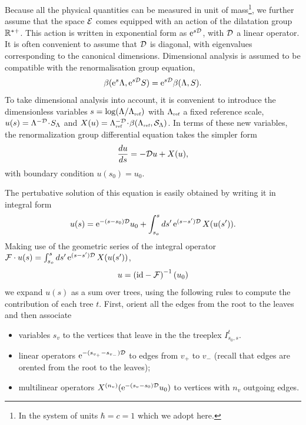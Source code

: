 \documentclass[12pt,here,feynmf]{article}
\begin{document}
Because all the physical quantities can be measured in unit of mass\footnote{In the system of units $\hbar=c=1$ which we adopt here.}, we further assume that the space ${\cal E}$ comes equipped with an action of the dilatation group ${\Bbb R}^{\ast+}$. This action is  written in exponential form as  $\mathrm{e}^{s{\cal D}}$, with ${\cal D}$ a linear operator. It is often convenient to assume that ${\cal D}$ is diagonal, with eigenvalues corresponding to the canonical dimensions. Dimensional analysis is assumed to be compatible with the renormalisation group equation,
\begin{equation}
\beta(\mathrm{e}^{s}\Lambda,\mathrm{e}^{s{\cal D}}
S)=\mathrm{e}^{s{\cal D}}\beta(\Lambda,S).
\end{equation}
To take dimensional analysis into account, it is convenient to  introduce the dimensionless variables
$s=\log(\Lambda/\Lambda_{\mbox{\tiny ref}})$ with
$\Lambda_{\mbox{\tiny ref}}$ a fixed reference scale,
$u(s)=\Lambda^{-{\cal D}}\!\cdot\!S_{\Lambda}$ and
$X(u)={\Lambda}^{-{\cal D}}_{\mbox{\tiny
ref}}\!\cdot\!\beta({\Lambda}_{\mbox{\tiny ref}},{\cal
S}_{\Lambda})$. In terms of these new variables, the renormalization group differential equation takes the simpler form
\begin{equation}
\frac{du}{ds}=-{\cal D}u+X(u),
\end{equation}
with boundary condition $u(s_{0})=u_{0}$. 

The pertubative solution of this equation is easily obtained by writing it in integral form
\begin{equation}
u(s)=\mathrm{e}^{-(s-s_{0}){\cal D}}u_{0}+\int_{s_{o}}^{s}ds'\, \mathrm{e}^{(s-s'){\cal D}}\,X(u(s')).\label{fixedrg}
\end{equation}
Making use of the geometric series of the integral operator ${\cal F}\cdot u(s)=\int_{s_{o}}^{s}ds'\, \mathrm{e}^{(s-s'){\cal D}}\,X(u(s'))$, 
\begin{equation}
u=\left(\mathrm{id}-{\cal F}\right)^{-1}(u_{0})\label{diffpert}
\end{equation}
we expand $u(s)$ as a sum over trees,  using the following rules to compute the contribution of each tree $t$. First, orient all the edges from the root to the leaves and then associate 

\begin{itemize}

\item
variables $s_{v}$ to the vertices that leave in the the treeplex $I_{s_{0},s}^{t}$.

\item
linear operators $\mathrm{e}^{-(s_{v_{+}}-s_{v_{-}}){\cal D}}$ to edges from $v_{+}$ to $v_{-}$ (recall that edges are orented from the root to the leaves); 

\item multilinear operators $X^{(n_{v})}(\mathrm{e}^{-(s_{v}-s_{0}){\cal D}}  u_{0})$
 to vertices with $n_{v}$ outgoing edges.

\end{itemize}
\end{document}
